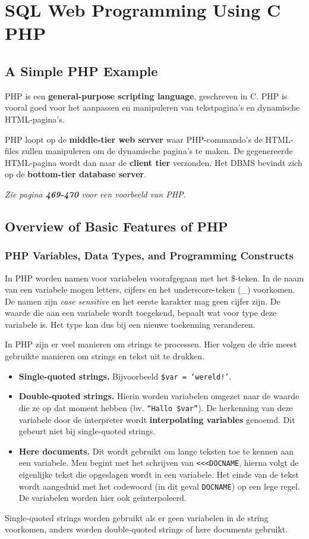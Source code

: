 \chapter{SQL Web Programming Using C PHP}
\section{A Simple PHP Example}
PHP is een \textbf{general-purpose scripting language}, geschreven in C. PHP is vooral goed voor het aanpassen en manipuleren van tekstpagina's en dynamische HTML-pagina's.

PHP loopt op de \textbf{middle-tier web server} waar PHP-commando's de HTML-files zullen manipuleren om de dynamische pagina's te maken. De gegenereerde HTML-pagina wordt dan naar de \textbf{client tier} verzonden. Het DBMS bevindt zich op de \textbf{bottom-tier database server}.

\textit{Zie pagina \textbf{469-470} voor een voorbeeld van PHP.}



\section{Overview of Basic Features of PHP}
\subsection{PHP Variables, Data Types, and Programming Constructs}
In PHP worden namen voor variabelen voorafgegaan met het \$-teken. In de naam van een variabele mogen letters, cijfers en het underscore-teken (\_) voorkomen. De namen zijn \textit{case sensitive} en het eerste karakter mag geen cijfer zijn. De waarde die aan een variabele wordt toegekend, bepaalt wat voor type deze variabele is. Het type kan dus bij een nieuwe toekenning veranderen.

In PHP zijn er veel manieren om strings te processen. Hier volgen de drie meest gebruikte manieren om strings en tekst uit te drukken.
\begin{itemize}
	\item \textbf{Single-quoted strings.} Bijvoorbeeld \texttt{\$var = `wereld!'}.
	\item \textbf{Double-quoted strings.} Hierin worden variabelen omgezet naar de waarde die ze op dat moment hebben (bv. \texttt{``Hallo \$var''}). De herkenning van deze variabele door de interpreter wordt \textbf{interpolating variables} genoemd. Dit gebeurt niet bij single-quoted strings.
	\item \textbf{Here documents.} Dit wordt gebruikt om lange teksten toe te kennen aan een variabele. Men begint met het schrijven van \texttt{<<<DOCNAME}, hierna volgt de eigenlijke tekst die opgeslagen wordt in een variabele. Het einde van de tekst wordt aangeduid met het codewoord (in dit geval \texttt{DOCNAME}) op een lege regel. De variabelen worden hier ook ge\"interpoleerd.
\end{itemize}
Single-quoted strings worden gebruikt als er geen variabelen in de string voorkomen, anders worden double-quoted strings of here documents gebruikt.

